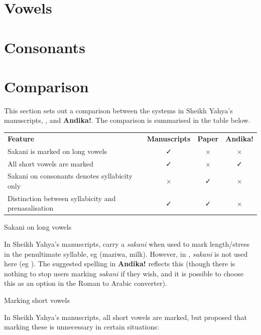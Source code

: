 \documentclass[a4paper,10pt, oneside]{book}
\newcommand\AS[1]{{\citationfont\RLE{#1}}}
\begin{document}
\chapter{Vowels}


\chapter{Consonants}


\chapter{Comparison}



This section sets out a comparison between the systems in Sheikh Yahya's manuscripts, \citet{Omar1997}, and \textbf{Andika!}. The comparison is summarised in the table below.

\begin{center}
\begin{tabular}{lccc}
\textbf{Feature} & \textbf{Manuscripts} & \textbf{Paper} & \textbf{Andika!} \\
\cline{1-4}\noalign{\medskip}
Sakani is marked on long vowels & ✓ & $\times$ & $\times$ \\
All short vowels are marked & ✓ & $\times$ & ✓ \\
Sakani on consonants denotes syllabicity only & $\times$ & ✓ & $\times$ \\
Distinction between syllabicity and prenasalisation & ✓ & ✓ & $\times$ \\
\end{tabular}
\end{center}

Sakani on long vowels

In Sheikh Yahya's manuscripts, \AS{ي و} carry a \textit{sakani} when used to mark length/stress in the penultimate syllable, eg \AS{مَزِيْوَ} (maziwa, milk). However, in \citet{Omar1997}, \textit{sakani} is not used here (eg \AS{مَزيوَ}). The suggested spelling in \textbf{Andika!} reflects this (though there is nothing to stop users marking \textit{sakani} if they wish, and it is possible to choose this as an option in the Roman to Arabic converter).

Marking short vowels

In Sheikh Yahya's manuscripts, all short vowels are marked, but \citet{Omar1997} proposed that marking these is unnecessary in certain situations:
\end{document}
